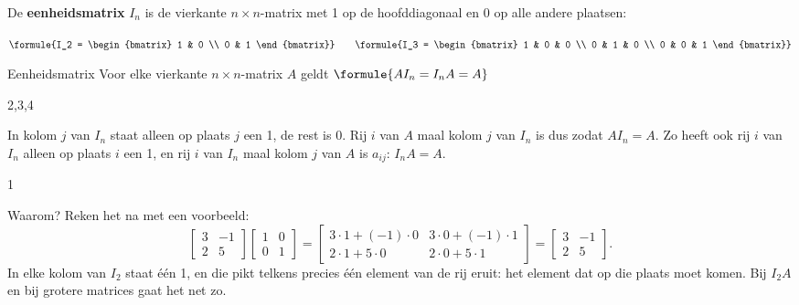 \begin{theorie}
De \textbf{\textcolor{accent}{eenheidsmatrix}} $I_n$ is de vierkante $n \times n$-matrix met 1 op de hoofddiagonaal en 0 op alle andere plaatsen:

\vspace{1mm}
\qquad $\formule{I_2 = \begin{bmatrix} 1 & 0 \\ 0 & 1 \end{bmatrix}} \qquad \formule{I_3 = \begin{bmatrix} 1 & 0 & 0 \\ 0 & 1 & 0 \\ 0 & 0 & 1 \end{bmatrix}}$

\begin{stelling}{Eenheidsmatrix}
Voor elke vierkante $n \times n$-matrix $A$ geldt \quad $\formule{A I_n = I_n A = A}$
\end{stelling}
\begin{alleenvoor}{2,3,4}

\begin{bewijs}
In kolom $j$ van $I_n$ staat alleen op plaats $j$ een 1, de rest is 0. Rij $i$ van $A$ maal kolom $j$ van $I_n$ is dus
zodat $AI_n = A$. Zo heeft ook rij $i$ van $I_n$ alleen op plaats $i$ een 1, en rij $i$ van $I_n$ maal kolom $j$ van $A$ is $a_{ij}$: $I_n A = A$.
\end{bewijs}
\end{alleenvoor}
\end{theorie}
\begin{alleenvoor}{1}

Waarom? Reken het na met een voorbeeld:
\[ \begin{bmatrix} 3 & -1 \\ 2 & 5 \end{bmatrix} \begin{bmatrix} 1 & 0 \\ 0 & 1 \end{bmatrix} = \begin{bmatrix} 3 \cdot 1 + (-1) \cdot 0 & 3 \cdot 0 + (-1) \cdot 1 \\ 2 \cdot 1 + 5 \cdot 0 & 2 \cdot 0 + 5 \cdot 1 \end{bmatrix} = \begin{bmatrix} 3 & -1 \\ 2 & 5 \end{bmatrix} . \]
In elke kolom van $I_2$ staat één 1, en die pikt telkens precies één element van de rij eruit: het element dat op die plaats moet komen. Bij $I_2 A$ en bij grotere matrices gaat het net zo.
\end{alleenvoor}

